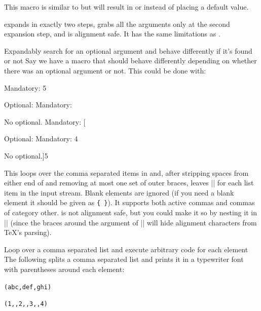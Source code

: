 \begin{function}{\ekvoptargTF}
  \begin{syntax}
  \end{syntax}
  This macro is similar to  but will result in
   or 
  instead of placing a default value.

   expands in exactly two steps, grabs all the arguments only at
  the second expansion step, and is alignment safe. It has the same limitations
  as .
\end{function}
\begin{example}
    {Expandably search for an optional argument and behave differently if it's
    found or not}
  Say we have a macro that should behave differently depending on whether there
  was an optional argument or not. This could be done with:
  \makeatletter
  \begin{enverb}
    \newcommand\foo{\ekvoptargTF\foo@a\foo@b}
    \newcommand\foo@a[2]{Mandatory: #2\par Optional: #1}
    \newcommand\foo@b[1]{Mandatory: #1\par No optional.}
    \foo{5}\par
    \foo[4]{5}\par
  \end{enverb}
\end{example}

\begin{function}{\ekvcsvloop}
  \begin{syntax}
  \end{syntax}
  This loops over the comma separated items in  and, after
  stripping spaces from either end of  and removing at most one set
  of outer braces, leaves || for each list
  item in the input stream. Blank elements are ignored (if you need a blank
  element it should be given as \verb*|{ }|). It supports both active commas and
  commas of category other.  is not alignment safe, but you could
  make it so by nesting it in |\expanded| (since the braces around the argument
  of |\expanded| will hide alignment characters from \TeX's parsing).
\end{function}
\begin{example}
    {Loop over a comma separated list and execute arbitrary code for each
    element}
  The following splits a comma separated list and prints it in a typewriter font
  with parentheses around each element:
  \begin{enverb}
    \newcommand*\myprocessor[1]{\texttt{(#1)}}
    \ekvcsvloop\myprocessor{abc,def,ghi}\par
    \ekvcsvloop\myprocessor{1,,2,,3,,4}\par
  \end{enverb}
\end{example}

